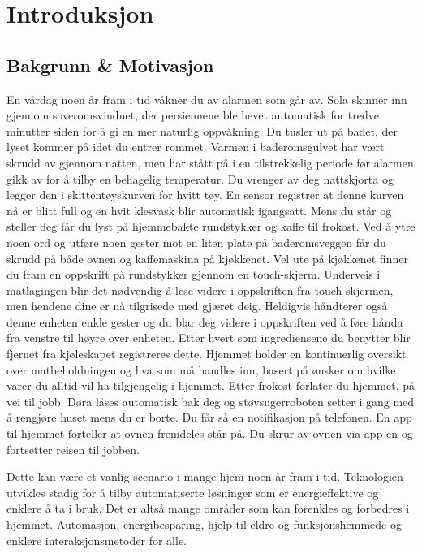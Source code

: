 \section[Introduksjon]{Introduksjon}
\subsection*{Bakgrunn \& Motivasjon}
En vårdag noen år fram i tid våkner du av alarmen som går av. Sola skinner inn gjennom soveromsvinduet, der persiennene ble hevet automatisk for tredve minutter siden for å gi en mer naturlig oppvåkning. Du tusler ut på badet, der lyset kommer på idet du entrer rommet. Varmen i baderomsgulvet har vært skrudd av gjennom natten, men har stått på i en tilstrekkelig periode før alarmen gikk av for å tilby en behagelig temperatur. Du vrenger av deg nattskjorta og legger den i skittentøyskurven for hvitt tøy. En sensor registrer at denne kurven nå er blitt full og en hvit klesvask blir automatisk igangsatt. Mens du står og steller deg får du lyst på hjemmebakte rundstykker og kaffe til frokost. Ved å ytre noen ord og utføre noen gester mot en liten plate på baderomsveggen får du skrudd på både ovnen og kaffemaskina på kjøkkenet. Vel ute på kjøkkenet finner du fram en oppskrift på rundstykker gjennom en touch-skjerm. Underveis i matlagingen blir det nødvendig å lese videre i oppskriften fra touch-skjermen, men hendene dine er nå tilgrisede med gjæret deig. Heldigvis håndterer også denne enheten enkle gester og du blar deg videre i oppskriften ved å føre hånda fra venstre til høyre over enheten. Etter hvert som ingrediensene du benytter blir fjernet fra kjøleskapet registreres dette. Hjemmet holder en kontinuerlig oversikt over matbeholdningen og hva som må handles inn, basert på ønsker om hvilke varer du alltid vil ha tilgjengelig i hjemmet. Etter frokost forlater du hjemmet, på vei til jobb. Døra låses automatisk bak deg og støvsugerroboten setter i gang med å rengjøre huset mens du er borte. Du får så en notifikasjon på telefonen. En app til hjemmet forteller at ovnen fremdeles står på. Du skrur av ovnen via app-en og fortsetter reisen til jobben.

Dette kan være et vanlig scenario i mange hjem noen år fram i tid. Teknologien utvikles stadig for å tilby automatiserte løsninger som er energieffektive og enklere å ta i bruk. Det er altså mange områder som kan forenkles og forbedres i hjemmet. Automasjon, energibesparing, hjelp til eldre og funksjonshemmede og enklere interaksjonsmetoder for alle.

